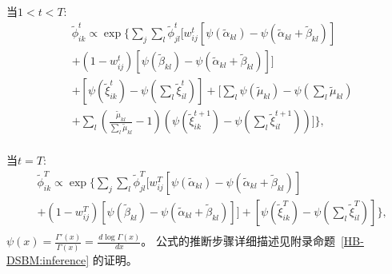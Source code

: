 当\textbf{$1<t<T$}:
\begin{equation}
\label{eq9}
\begin{split}
&\widetilde{\phi}_{ik}^t \propto \exp \{ \sum_j \sum_l \widetilde{\phi}_{jl}^t [w_{ij}^t[\psi(\widetilde{\alpha}_{kl}) - \psi(\widetilde{\alpha}_{kl}+\widetilde{\beta}_{kl})]\\
&+ (1-w_{ij}^t)[\psi(\widetilde{\beta}_{kl})-\psi(\widetilde{\alpha}_{kl}+\widetilde{\beta}_{kl})]]    \\
& + [\psi(\widetilde{\xi}_{ik}^t) - \psi(\sum_l \widetilde{\xi}_{il}^t)]+ [\sum_l \psi(\widetilde{\mu}_{kl}) - \psi(\sum_l \widetilde{\mu}_{kl}) \\
&+\sum_l (\frac{\widetilde{\mu}_{kl}}{\sum_l \widetilde{\mu}_{kl}} -1)(\psi(\widetilde{\xi}_{ik}^{t+1}) - \psi(\sum_l \widetilde{\xi}_{il}^{t+1}))]  \} ,\\
\end{split}
\end{equation} 

当\textbf{$t=T$}:
\begin{equation}
\label{eq10}
\begin{split}
&\widetilde{\phi}_{ik}^T \propto \exp \{ \sum_j \sum_l \widetilde{\phi}_{jl}^T [w_{ij}^T[\psi(\widetilde{\alpha}_{kl}) - \psi(\widetilde{\alpha}_{kl}+\widetilde{\beta}_{kl})]  \\
&+(1-w_{ij}^T)[\psi(\widetilde{\beta}_{kl})-\psi(\widetilde{\alpha}_{kl}+\widetilde{\beta}_{kl})]]  + [\psi(\widetilde{\xi}_{ik}^T) - \psi(\sum_l \widetilde{\xi}_{il}^T)]\} , \\
\end{split}
\end{equation} 
$\psi(x) = \frac{\Gamma'(x)}{\Gamma(x)} = \frac{\,d \log \Gamma(x)}{\, dx}$。
公式的推断步骤详细描述见附录命题~\ref{HB-DSBM:inference} 的证明。




